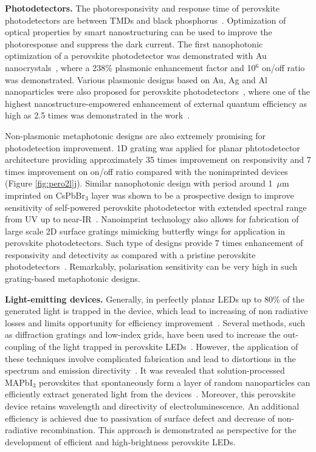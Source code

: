 \documentclass[journal=chreay,manuscript=review]{achemso}
\begin{document}
\textbf{Photodetectors.}
The photoresponsivity and response time of perovskite photodetectors are between TMDs and black phosphorus~\cite{wang2021recent}. Optimization of optical properties by smart nanostructuring can be used to improve the photoresponse and suppress the dark current. The first nanophotonic optimization of a perovskite photodetector was demonstrated with Au nanocrystals~\cite{dong2016improving}, where a 238\% plasmonic enhancement factor and 10$^6$ on/off ratio was demonstrated. Various plasmonic designs based on Au, Ag and Al nanoparticles were also proposed for perovskite photodetectors~\cite{sun2016plasmonic,wang2017plasmon,liu2019using,wang2018perovskite,li2018plasmonic, li2020enhanced, wang2020boosting}, where one of the highest nanostructure-empowered enhancement of external quantum efficiency as high as 2.5 times was demonstrated in the work~\cite{du2018plasmonic}. 

Non-plasmonic metaphotonic designs are also extremely promising for photodetection improvement. 1D grating was applied for planar phtotodetector architecture providing approximately 35 times improvement on responsivity and 7 times improvement on on/off ratio compared with the nonimprinted devices~\cite{wang2016nanoimprinted} (Figure \ref{fig:pero2l}j). Similar nanophotonic design with period around 1~$\mu$m imprinted on CsPbBr$_3$ layer was shown to be a prospective design to improve sensitivity of self-powered perovskite photodetector with extended spectral range from UV up to near-IR~\cite{cao2019self}. Nanoimprint technology also allows for fabrication of large scale 2D surface gratings mimicking butterfly wings for application in perovskite photodetectors. Such type of designs provide 7 times enhancement of responsivity and detectivity as compared with a pristine perovskite photodetectors~\cite{zhan2019butterfly}. Remarkably, polarisation sensitivity can be very high in such grating-based metaphotonic designs.

\textbf{Light-emitting devices.}
Generally, in perfectly planar LEDs up to 80\% of the generated light is trapped in the device, which lead to increasing of non radiative losses and limits opportunity for efficiency improvement~\cite{lee2003high}. Several methods, such as diffraction gratings and low-index grids, have been used to increase the out-coupling of the light trapped in perovskite LEDs~\citep{richter2016enhancing}. However, the application of these techniques involve complicated fabrication and lead to distortions in the spectrum and emission directivity~\citep{ziebarth2004extracting}. It was revealed that solution-processed MAPbI$_3$ perovskites that spontaneously form a layer of random nanoparticles can efficiently extract generated light from the devices~\cite{cao2018perovskite}. Moreover, this perovskite device retains wavelength and directivity of electroluminescence. An additional efficiency is achieved due to passivation of surface defect and decrease of non-radiative recombination. This approach is demonstrated as perspective for the development of efficient and high-brightness perovskite LEDs. 
\end{document}

